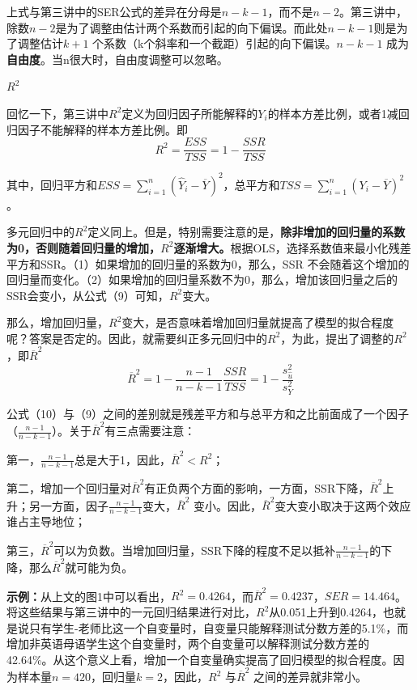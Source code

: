\documentclass[cn,10pt,math=newtx,citestyle=gb7714-2015,bibstyle=gb7714-2015]{elegantbook}
\begin{document}
	上式与第三讲中的SER公式的差异在分母是$n-k-1$，而不是$n-2$。第三讲中，除数$n-2$是为了调整由估计两个系数而引起的向下偏误。而此处$n-k-1$则是为了调整估计$k+1$ 个系数（k个斜率和一个截距）引起的向下偏误。$n-k-1$ 成为\textbf{自由度}。当n很大时，自由度调整可以忽略。
	
	\textbf{$R^2$}
	
	回忆一下，第三讲中$R^2$定义为回归因子所能解释的$Y_i$的样本方差比例，或者1减回归因子不能解释的样本方差比例。即
	\begin{equation}
		R^2=\frac{ESS}{TSS}=1-\frac{SSR}{TSS}
	\end{equation}
	
	其中，回归平方和$ESS=\sum_{i=1}^n{(\hat{Y}_i-\overline{Y})^2}$，总平方和$TSS=\sum_{i=1}^n{(Y_i-\overline{Y})^2}$。
	
	多元回归中的$R^2$定义同上。但是，特别需要注意的是，\textbf{除非增加的回归量的系数为0，否则随着回归量的增加，$R^2$逐渐增大。}根据OLS，选择系数值来最小化残差平方和SSR。（1）如果增加的回归量的系数为0，那么，SSR 不会随着这个增加的回归量而变化。（2）如果增加的回归量系数不为0，那么，增加该回归量之后的SSR会变小，从公式（9）可知，$R^2$变大。
	
	那么，增加回归量，$R^2$变大，是否意味着增加回归量就提高了模型的拟合程度呢？答案是否定的。因此，就需要纠正多元回归中的$R^2$，为此，提出了调整的$R^2$，即$\overline{R}^2$
	\begin{equation}
		\overline{R}^2=1-\frac{n-1}{n-k-1}\frac{SSR}{TSS}=1-\frac{s_{\hat{u}}^2}{s_Y^2}
	\end{equation}
	
	公式（10）与（9）之间的差别就是残差平方和与总平方和之比前面成了一个因子（$\frac{n-1}{n-k-1}$）。关于$\overline{R}^2$有三点需要注意：
	
	第一，$\frac{n-1}{n-k-1}$总是大于1，因此，$\overline{R}^2<R^2$；
	
	第二，增加一个回归量对$\overline{R}^2$有正负两个方面的影响，一方面，SSR下降，$\overline{R}^2$上升；另一方面，因子$\frac{n-1}{n-k-1}$变大，$\overline{R}^2$ 变小。因此，$\overline{R}^2$变大变小取决于这两个效应谁占主导地位；
	
	第三，$\overline{R}^2$可以为负数。当增加回归量，SSR下降的程度不足以抵补$\frac{n-1}{n-k-1}$的下降，那么$\overline{R}^2$就可能为负。
	
	\textbf{示例：}从上文的图1中可以看出，$R^2=0.4264$，而$\overline{R}^2=0.4237$，$SER=14.464$。将这些结果与第三讲中的一元回归结果进行对比，$R^2$从0.051上升到0.4264，也就是说只有学生-老师比这一个自变量时，自变量只能解释测试分数方差的5.1\%，而增加非英语母语学生这个自变量时，两个自变量可以解释测试分数方差的42.64\%。从这个意义上看，增加一个自变量确实提高了回归模型的拟合程度。因为样本量$n=420$，回归量$k=2$，因此，$R^2$ 与$\overline{R}^2$ 之间的差异就非常小。
	
\end{document}
